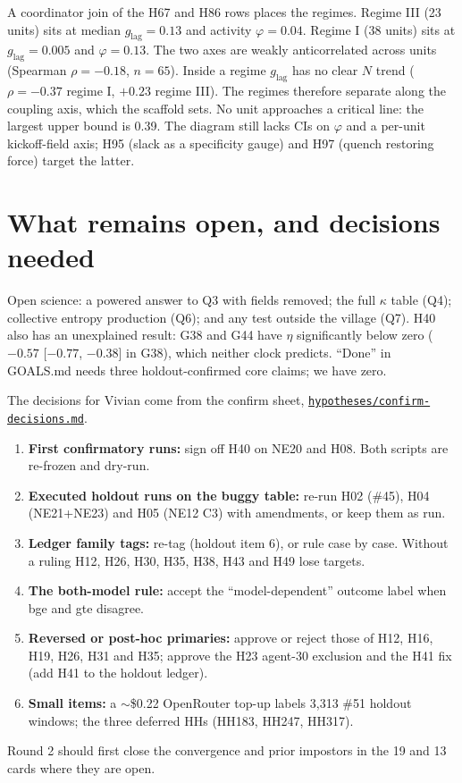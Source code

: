 \documentclass[aps,pre,reprint,10pt,nofootinbib]{revtex4-2}
\begin{document}
A coordinator join of the H67 and H86 rows places the regimes. Regime III (23 units) sits at median $g_\mathrm{lag}=0.13$ and activity $\varphi=0.04$. Regime I (38 units) sits at $g_\mathrm{lag}=0.005$ and $\varphi=0.13$. The two axes are weakly anticorrelated across units (Spearman $\rho=-0.18$, $n=65$). Inside a regime $g_\mathrm{lag}$ has no clear $N$ trend ($\rho=-0.37$ regime I, $+0.23$ regime III). The regimes therefore separate along the coupling axis, which the scaffold sets. No unit approaches a critical line: the largest upper bound is 0.39. The diagram still lacks CIs on $\varphi$ and a per-unit kickoff-field axis; H95 (slack as a specificity gauge) and H97 (quench restoring force) target the latter.

\section{What remains open, and decisions needed}
Open science: a powered answer to Q3 with fields removed; the full $\kappa$ table (Q4); collective entropy production (Q6); and any test outside the village (Q7). H40 also has an unexplained result: G38 and G44 have $\eta$ significantly below zero ($-0.57$ [$-0.77$, $-0.38$] in G38), which neither clock predicts. ``Done'' in GOALS.md needs three holdout-confirmed core claims; we have zero.

The decisions for Vivian come from the confirm sheet, \href{../../hypotheses/confirm-decisions.md}{\texttt{hypotheses/\allowbreak confirm-decisions.md}}.
\begin{enumerate}
\item \textbf{First confirmatory runs:} sign off H40 on NE20 and H08. Both scripts are re-frozen and dry-run.
\item \textbf{Executed holdout runs on the buggy table:} re-run H02 (\#45), H04 (NE21+NE23) and H05 (NE12 C3) with amendments, or keep them as run.
\item \textbf{Ledger family tags:} re-tag (holdout item 6), or rule case by case. Without a ruling H12, H26, H30, H35, H38, H43 and H49 lose targets.
\item \textbf{The both-model rule:} accept the ``model-dependent'' outcome label when bge and gte disagree.
\item \textbf{Reversed or post-hoc primaries:} approve or reject those of H12, H16, H19, H26, H31 and H35; approve the H23 agent-30 exclusion and the H41 fix (add H41 to the holdout ledger).
\item \textbf{Small items:} a $\sim$\$0.22 OpenRouter top-up labels 3{,}313 \#51 holdout windows; the three deferred HHs (HH183, HH247, HH317).
\end{enumerate}
Round 2 should first close the convergence and prior impostors in the 19 and 13 cards where they are open.
\end{document}
